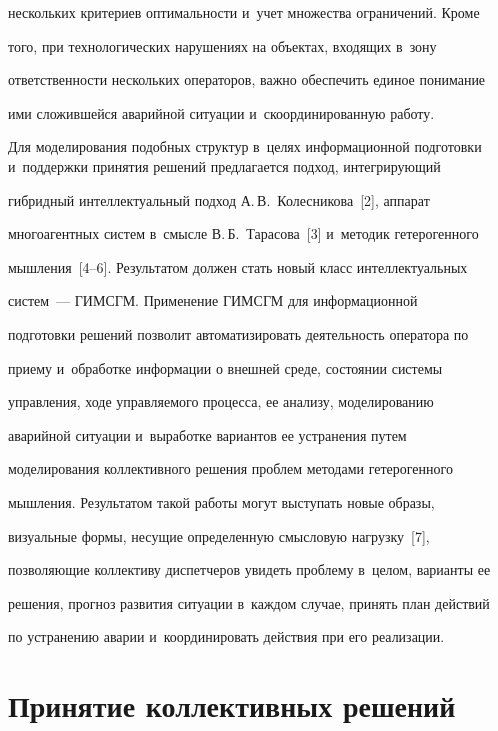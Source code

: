 нескольких критериев оптимальности и~учет множества ограничений. Кроме 


того, при технологических нарушениях на объектах, входящих в~зону 


ответственности нескольких операторов, важно обеспечить единое понимание 


ими сложившейся аварийной ситуации и~скоординированную работу.


  


  Для моделирования подобных структур в~целях информационной подготовки и~поддержки принятия решений предлагается подход, интегрирующий 


гибридный интеллектуальный подход А.\,В.~Колесникова~[2], аппарат 


многоагентных систем в~смысле В.\,Б.~Тарасова~[3] и~методик гетерогенного 


мышления~[4--6]. Результатом должен стать новый класс интеллектуальных 


систем~--- ГИМСГМ. Применение ГИМСГМ для информационной 


подготовки решений позволит автоматизировать деятельность оператора по 


приему и~обработке информации о внешней среде, состоянии системы 


управления, ходе управляемого процесса, ее анализу, моделированию 


аварийной ситуации и~выработке вариантов ее устранения путем 


моделирования коллективного решения проблем методами гетерогенного 


мышления. Результатом такой работы могут выступать новые образы, 


визуальные формы, несущие определенную смысловую нагрузку~[7], 


позволяющие коллективу диспетчеров увидеть проблему в~целом, варианты ее 


решения, прогноз развития ситуации в~каждом случае, принять план действий 


по устранению аварии и~координировать действия при его реализации. 


  


\section{Принятие коллективных решений}





